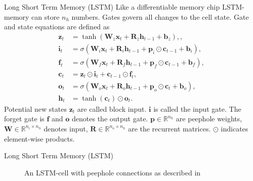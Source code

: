 \documentclass{beamer}
\begin{document}
    \begin{frame}{Long Short Term Memory (LSTM)}
      Like a differentiable memory chip \cite{graves2012supervised} LSTM-memory can store $n_h$ numbers. Gates govern all changes to the cell state.
      Gate and state equations are defined as~\cite{hochreiter1997long,greff2016lstm}
      \begin{align}
          \mathbf{z}_t &= \tanh( \mathbf{W}_z \mathbf{x}_t + \mathbf{R}_z \mathbf{h}_{t-1}
                                + \mathbf{b}_z), \label{eq:state_candidate}, \\
          \mathbf{i}_t &=  \sigma( \mathbf{W}_i \mathbf{x}_t + \mathbf{R}_i \mathbf{h}_{t-1}
                               + \mathbf{p}_i \odot \mathbf{c}_{t-1}+ \mathbf{b}_i), \label{eq:input} \\
          \mathbf{f}_t &= \sigma(\mathbf{W}_f \mathbf{x}_t + \mathbf{R}_f \mathbf{h}_{t-1}
                                + \mathbf{p}_f \odot \mathbf{c}_{t-1}+ \mathbf{b}_f), \label{eq:forget} \\
          \mathbf{c}_t &= \mathbf{z}_t \odot \mathbf{i}_t + \mathbf{c}_{t-1} \odot \mathbf{f}_t, \\
          \mathbf{o}_t &= \sigma(\mathbf{W}_o \mathbf{x}_t + \mathbf{R}_o \mathbf{h}_{t-1}
                                + \mathbf{p}_o \odot \mathbf{c}_t+ \mathbf{b}_o), \label{eq:output} \\
          \mathbf{h}_t &= \tanh(\mathbf{c}_t) \odot \mathbf{o}_t.
      \end{align}
      Potential new states $\mathbf{z}_t$ are called block input. 
      $\mathbf{i}$ is called the input gate. The forget gate is $\mathbf{f}$ and
      $\mathbf{o}$ denotes the output gate.
      $\mathbf{p} \in \mathbb{R}^{n_h}$ are peephole weights,
      $\mathbf{W} \in \mathbb{R}^{n_i \times n_h}$ denotes input,
      $\mathbf{R} \in \mathbb{R}^{n_o \times n_h}$ are the recurrent matrices.
      $\odot$ indicates element-wise products. 
    \end{frame}


    \begin{frame}{Long Short Term Memory (LSTM)}
      \begin{figure}
        
        \caption{An LSTM-cell with peephole connections as described in \cite{hochreiter1997long,greff2016lstm}}
      \end{figure}
    \end{frame}
\end{document}
